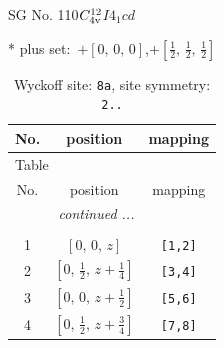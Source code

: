 \documentclass[fleqn,8pt]{jsarticle}
\begin{document}
\setcounter{MaxMatrixCols}{32}

\renewcommand{\tablename}{Table~}
\renewcommand{\figurename}{Figure~}
\begin{center}
\LARGE
SG No. 110\quad$C_{\rm 4v}^{12}$\quad$I4_1cd$\quad[ tetragonal ]
\end{center}
* plus set:\,\,\,$+\left[ 0,\, 0,\, 0 \right]$,\quad $+\left[ \frac{1}{2},\, \frac{1}{2},\, \frac{1}{2} \right]$
\renewcommand{\arraystretch}{1.2}
\begin{longtable}{ccc}
\caption{Wyckoff site: {\tt 8a}, site symmetry: {\tt 2..}}
 \\
 \hline \hline
No. & position & mapping \\ \hline \endfirsthead

\multicolumn{2}{l}{\tablename\ \thetable{}} \\
 \hline \hline
No. & position & mapping \\ \hline \endhead

 \hline \hline
\multicolumn{2}{r}{\footnotesize\it continued ...} \\ \endfoot

 \hline \hline
\multicolumn{2}{r}{} \\ \endlastfoot

1 & $\left[ 0,\, 0,\, z \right]$ & {\tt [1,2]} \\ \hline
2 & $\left[ 0,\, \frac{1}{2},\, z + \frac{1}{4} \right]$ & {\tt [3,4]} \\ \hline
3 & $\left[ 0,\, 0,\, z + \frac{1}{2} \right]$ & {\tt [5,6]} \\ \hline
4 & $\left[ 0,\, \frac{1}{2},\, z + \frac{3}{4} \right]$ & {\tt [7,8]} \\
\end{longtable}
\renewcommand{\arraystretch}{1.2}
\end{document}
